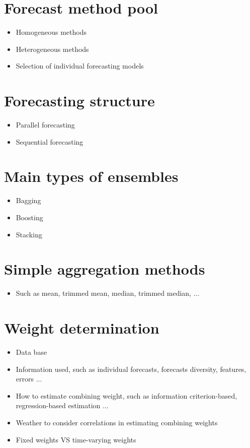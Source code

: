 \documentclass[11pt]{article}
\begin{document}
\section{Forecast method pool}
\begin{itemize}
\item Homogeneous methods
\item Heterogeneous methods
\item Selection of individual forecasting models
\end{itemize}


\section{Forecasting structure}
\begin{itemize}
\item Parallel forecasting
\item Sequential forecasting
\end{itemize}


\section{Main types of ensembles}
\begin{itemize}
\item Bagging
\item Boosting
\item Stacking
\end{itemize}


\section{Simple aggregation methods}
\begin{itemize}
\item Such as mean, trimmed mean, median, trimmed median, ...
\end{itemize}


\section{Weight determination}
\begin{itemize}
\item Data base
\item Information used, such as individual forecasts, forecasts diversity, features, errors ...
\item How to estimate combining weight, such as information criterion-based, regression-based estimation ...
\item Weather to consider correlations in estimating combining weights
\item Fixed weights VS time-varying weights
\end{itemize}
\end{document}
